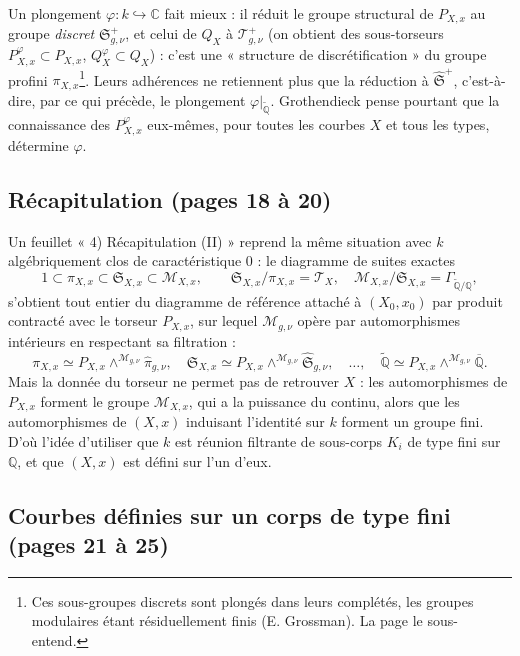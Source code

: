 \documentclass[11pt,a4paper]{article}
\begin{document}
Un plongement $\varphi : k \hookrightarrow \mathbb{C}$ fait mieux : il réduit
le groupe structural de $P_{X,x}$ au groupe \emph{discret}
$\mathfrak{S}^{+}_{g,\nu}$, et celui de $Q_X$ à $\mathcal{T}^{+}_{g,\nu}$
(on obtient des sous-torseurs $P^{\varphi}_{X,x} \subset P_{X,x}$,
$Q^\varphi_X \subset Q_X$) : c'est une « structure de discrétification » du
groupe profini $\pi_{X,x}$\footnote{Ces sous-groupes discrets sont plongés dans
leurs complétés, les groupes modulaires étant résiduellement finis
(E. Grossman). La page le sous-entend.}. Leurs adhérences ne retiennent
plus que la réduction à $\hat{\mathfrak{S}}^{+}$, c'est-à-dire, par ce qui
précède, le plongement $\varphi|_{\widetilde{\mathbb{Q}}}$. Grothendieck pense
pourtant que la connaissance des $P^{\varphi}_{X,x}$ eux-mêmes, pour toutes
les courbes $X$ et tous les types, détermine $\varphi$.

\subsection*{Récapitulation (pages 18 à 20)}

Un feuillet « 4) Récapitulation (II) » reprend la même situation avec
$k$ algébriquement clos de caractéristique $0$ : le diagramme de suites
exactes
\[
1 \subset \pi_{X,x} \subset \mathfrak{S}_{X,x} \subset \mathcal{M}_{X,x},
\qquad \mathfrak{S}_{X,x}/\pi_{X,x} = \mathcal{T}_X, \quad
\mathcal{M}_{X,x}/\mathfrak{S}_{X,x} = \Gamma_{\widetilde{\mathbb{Q}}/\mathbb{Q}},
\]
s'obtient tout entier du diagramme de référence attaché à $(X_0, x_0)$ par
produit contracté avec le torseur $P_{X,x}$, sur lequel $\mathcal{M}_{g,\nu}$
opère par automorphismes intérieurs en respectant sa filtration :
\[
\pi_{X,x} \simeq P_{X,x} \wedge^{\mathcal{M}_{g,\nu}} \hat\pi_{g,\nu}, \quad
\mathfrak{S}_{X,x} \simeq P_{X,x} \wedge^{\mathcal{M}_{g,\nu}} \hat{\mathfrak{S}}_{g,\nu}, \quad \ldots, \quad
\widetilde{\mathbb{Q}} \simeq P_{X,x} \wedge^{\mathcal{M}_{g,\nu}} \overline{\mathbb{Q}} .
\]
Mais la donnée du torseur ne permet pas de retrouver $X$ : les
automorphismes de $P_{X,x}$ forment le groupe $\mathcal{M}_{X,x}$, qui a la
puissance du continu, alors que les automorphismes de $(X, x)$ induisant
l'identité sur $k$ forment un groupe fini. D'où l'idée d'utiliser que $k$ est
réunion filtrante de sous-corps $K_i$ de type fini sur $\mathbb{Q}$, et que
$(X, x)$ est défini sur l'un d'eux.

\subsection*{Courbes définies sur un corps de type fini (pages 21 à 25)}
\end{document}

